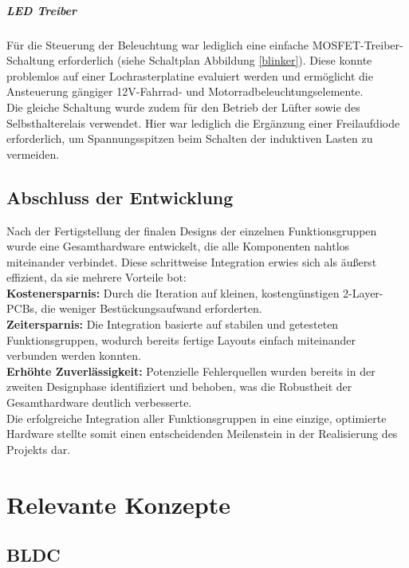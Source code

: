 \documentclass[paper=a4,11pt]{scrreprt}
\begin{document}
\paragraph{LED Treiber}
Für die Steuerung der Beleuchtung war lediglich eine einfache MOSFET-Treiber-Schaltung erforderlich (siehe Schaltplan Abbildung \ref{blinker}). Diese konnte problemlos auf einer Lochrasterplatine evaluiert werden und ermöglicht die Ansteuerung gängiger 12V-Fahrrad- und Motorradbeleuchtungselemente.\\
Die gleiche Schaltung wurde zudem für den Betrieb der Lüfter sowie des Selbsthaltere­lais verwendet. Hier war lediglich die Ergänzung einer Freilaufdiode erforderlich, um Spannungsspitzen beim Schalten der induktiven Lasten zu vermeiden.
\newpage
\section{Abschluss der Entwicklung}
Nach der Fertigstellung der finalen Designs der einzelnen Funktionsgruppen wurde eine Gesamthardware entwickelt, die alle Komponenten nahtlos miteinander verbindet. Diese schrittweise Integration erwies sich als äußerst effizient, da sie mehrere Vorteile bot:\\
\textbf{Kostenersparnis:} Durch die Iteration auf kleinen, kostengünstigen 2-Layer-PCBs, die weniger Bestückungsaufwand erforderten.\\
\textbf{Zeitersparnis:} Die Integration basierte auf stabilen und getesteten Funktionsgruppen, wodurch bereits fertige Layouts einfach miteinander verbunden werden konnten.\\
\textbf{Erhöhte Zuverlässigkeit:} Potenzielle Fehlerquellen wurden bereits in der zweiten Designphase identifiziert und behoben, was die Robustheit der Gesamthardware deutlich verbesserte.\\
Die erfolgreiche Integration aller Funktionsgruppen in eine einzige, optimierte Hardware stellte somit einen entscheidenden Meilenstein in der Realisierung des Projekts dar.


\chapter{Relevante Konzepte}
\section{BLDC}
\end{document}
